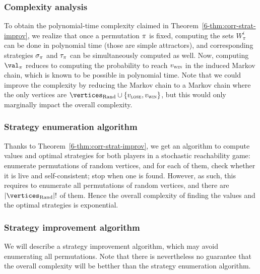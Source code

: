 \subsubsection{Complexity analysis}

To obtain the polynomial-time complexity claimed in
Theorem~\ref{6-thm:corr-strat-improv}, we realize that once a
permutation $\pi$ is fixed, computing the sets $W_\pi^i$ can be done
in polynomial time (those are simple attractors), and corresponding
strategies $\sigma_\pi$ and $\tau_\pi$ can be simultaneously
computed as well. Now, computing $\val_\perm$ reduces to computing the
probability to reach $v_{\textsc{win}}$ in the induced Markov chain, which is
known to be possible in polynomial time. Note that we could improve
the complexity by reducing the Markov chain to a Markov chain where
the only vertices are $\Randomvertices \cup \{\vlose,\vwin\}$, but
this would only marginally impact the overall complexity.

\subsubsection{Strategy enumeration algorithm}
\label{6-subsubsec:last}

Thanks to Theorem~\ref{6-thm:corr-strat-improv}, we get an algorithm
to compute values and optimal strategies for both players in a
stochastic reachability game: enumerate permutations of random
vertices, and for each of them, check whether it is live and
self-consistent; stop when one is found.
%
However, as such, this requires to enumerate all permutations of
random vertices, and there are $|\Randomvertices|!$ of them. Hence the
overall complexity of finding the values and the optimal strategies is
exponential.



\subsubsection{Strategy improvement algorithm}
\label{6subsubsec:algo-strat-improv}


We will describe a strategy improvement algorithm, which may avoid
enumerating all permutations. Note that there is nevertheless no
guarantee that the overall complexity will be betther than the
strategy enumeration algorithm.

